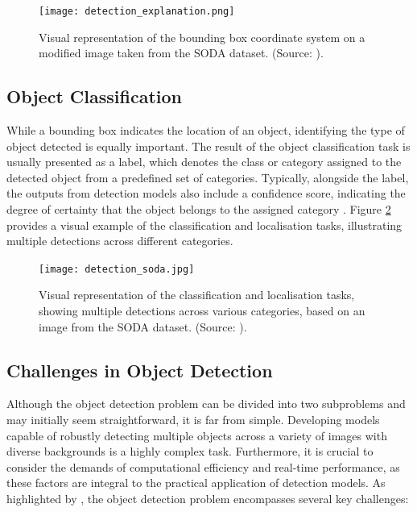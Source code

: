 \begin{figure}[!htbp]
    \centering
    \texttt{[image: detection\_explanation.png]}
    \caption{Visual representation of the bounding box coordinate system on a modified image taken from the SODA dataset. (Source: \cite{soda_dataset}).}
    \label{fig:detection_explanation}
\end{figure}

\subsection{Object Classification}
\label{subsec:2_classification}

While a bounding box indicates the location of an object, identifying the type of object detected is equally important. The result of the object classification task is usually presented as a label, which denotes the class or category assigned to the detected object from a predefined set of categories. Typically, alongside the label, the outputs from detection models also include a confidence score, indicating the degree of certainty that the object belongs to the assigned category \cite{od_2}. Figure \ref{fig:classification_explanation} provides a visual example of the classification and localisation tasks, illustrating multiple detections across different categories.

\begin{figure}[!htbp]
    \centering
    \texttt{[image: detection\_soda.jpg]}
    \caption{Visual representation of the classification and localisation tasks, showing multiple detections across various categories, based on an image from the SODA dataset. (Source: \cite{soda_dataset}).}
    \label{fig:classification_explanation}
\end{figure}

\subsection{Challenges in Object Detection}
\label{subsec:2_challenges}

Although the object detection problem can be divided into two subproblems and may initially seem straightforward, it is far from simple. Developing models capable of robustly detecting multiple objects across a variety of images with diverse backgrounds is a highly complex task. Furthermore, it is crucial to consider the demands of computational efficiency and real-time performance, as these factors are integral to the practical application of detection models. As highlighted by \cite{od_survey_problems}, the object detection problem encompasses several key challenges:

